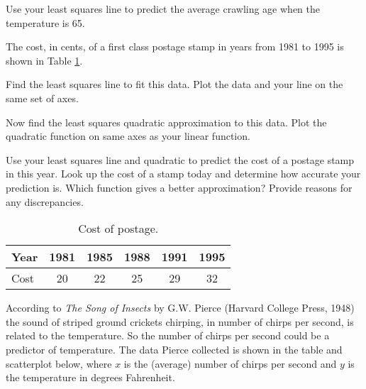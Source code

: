 	\item Use your least squares line to predict the average crawling age when the temperature is 65. 
	\ea


\item The cost, in cents, of a first class postage stamp in years from 1981 to 1995 is shown in Table \ref{T:7_d_stamps}.

	\ba
	\item Find the least squares line to fit this data. Plot the data and your line on the same set of axes. 
	\item Now find the least squares quadratic approximation to this data. Plot the quadratic function on same axes as your linear function. 
	\item Use your least squares line and quadratic to predict the cost of a postage stamp in this year. Look up the cost of a stamp today and determine how accurate your prediction is. Which function gives a better approximation? Provide reasons for any discrepancies.  
	\ea

\begin{table}[h]
\begin{center}
\begin{tabular}{|l||c|c|c|c|c|} \hline
Year	&1981	&1985	&1988	&1991	&1995 \\ \hline
Cost	&20		&22		&25		&29		&32  \\ \hline
\end{tabular}
\end{center}
\caption{Cost of postage.}
\label{T:7_d_stamps}
\end{table}


\item According to \emph{The Song of Insects} by G.W. Pierce (Harvard College Press, 1948) the sound of striped ground crickets chirping, in number of chirps per second, is related to the temperature. So the number of chirps per second could be a predictor of temperature. The data Pierce collected is shown in the table and scatterplot below, where $x$ is the (average) number of chirps per second and $y$ is the temperature in degrees Fahrenheit. 

